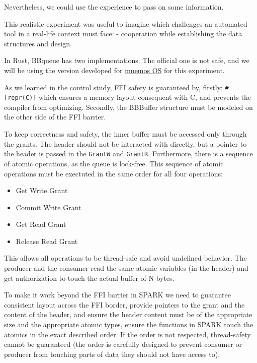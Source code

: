\documentclass[nomenclature, english, bibtex]{kththesis}
\begin{document}
Nevertheless, we could use the experience to pass on some information.

This realistic experiment was useful to imagine which challenges an automated tool in a real-life context must face:
- cooperation while establishing the data structures and design.






In Rust, BBqueue has two implementations. The official one is not  safe, and we will be using the version developed for \href{https://github.com/tosc-rs/mnemos/tree/main/source/abi/src/bbqueue_ipc}{mnemos OS} for this experiment.  

As we learned in the control study,  FFI safety is guaranteed by, firstly:  \texttt{\#[repr(C)]} which ensures a memory layout consequent with C, and prevents the compiler from optimizing. Secondly, the BBBuffer structure must be modeled on the other side of the FFI barrier.

To keep correctness and safety, the inner buffer must be accessed only through the grants. The header should not be interacted with directly, but a pointer to the header is passed in the  \texttt{GrantW} and \texttt{GrantR}. 
Furthermore, there is a sequence of atomic operations, as the queue is lock-free. This sequence of atomic operations must be exectuted in the same order for all four operations:
\begin{itemize}
    \item Get Write Grant
    \item Commit Write Grant
    \item Get Read Grant
    \item Release Read Grant
\end{itemize}
   
This allows all operations to be thread-safe and avoid undefined behavior. The producer and the consumer read the same atomic variables (in the header) and get authorization to touch the actual buffer of N bytes.


To make it work beyond the FFI barrier in SPARK we need to guarantee consistent layout across the FFI border, provide pointers to the grant and the content of the header, and ensure the header content must be of the appropriate size and the appropriate atomic types, ensure the functions in SPARK touch the atomics in the exact described order. If the order is not respected, thread-safety cannot be guaranteed (the order is carefully designed to prevent consumer or producer from touching parts of data they should not have access to).
\end{document}
